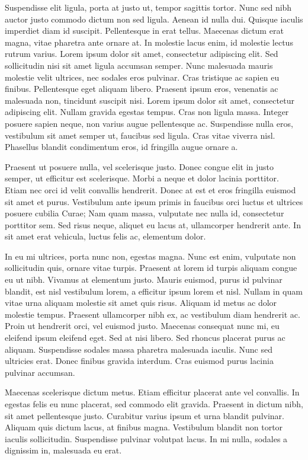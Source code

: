 Suspendisse elit ligula, porta at justo ut, tempor sagittis tortor. Nunc sed nibh auctor justo commodo dictum non sed ligula. Aenean id nulla dui. Quisque iaculis imperdiet diam id suscipit. Pellentesque in erat tellus. Maecenas dictum erat magna, vitae pharetra ante ornare at. In molestie lacus enim, id molestie lectus rutrum varius.
Lorem ipsum dolor sit amet, consectetur adipiscing elit. Sed sollicitudin nisi sit amet ligula accumsan semper. Nunc malesuada mauris molestie velit ultrices, nec sodales eros pulvinar. Cras tristique ac sapien eu finibus. Pellentesque eget aliquam libero. Praesent ipsum eros, venenatis ac malesuada non, tincidunt suscipit nisi. Lorem ipsum dolor sit amet, consectetur adipiscing elit. Nullam gravida egestas tempus. Cras non ligula massa. Integer posuere sapien neque, non varius augue pellentesque ac. Suspendisse nulla eros, vestibulum sit amet semper ut, faucibus sed ligula. Cras vitae viverra nisl. Phasellus blandit condimentum eros, id fringilla augue ornare a.

Praesent ut posuere nulla, vel scelerisque justo. Donec congue elit in justo semper, ut efficitur est scelerisque. Morbi a neque et dolor lacinia porttitor. Etiam nec orci id velit convallis hendrerit. Donec at est et eros fringilla euismod sit amet et purus. Vestibulum ante ipsum primis in faucibus orci luctus et ultrices posuere cubilia Curae; Nam quam massa, vulputate nec nulla id, consectetur porttitor sem. Sed risus neque, aliquet eu lacus at, ullamcorper hendrerit ante. In sit amet erat vehicula, luctus felis ac, elementum dolor.

In eu mi ultrices, porta nunc non, egestas magna. Nunc est enim, vulputate non sollicitudin quis, ornare vitae turpis. Praesent at lorem id turpis aliquam congue eu ut nibh. Vivamus at elementum justo. Mauris euismod, purus id pulvinar blandit, est nisl vestibulum lorem, a efficitur ipsum lorem et nisl. Nullam in quam vitae urna aliquam molestie sit amet quis risus. Aliquam id metus ac dolor molestie tempus. Praesent ullamcorper nibh ex, ac vestibulum diam hendrerit ac. Proin ut hendrerit orci, vel euismod justo. Maecenas consequat nunc mi, eu eleifend ipsum eleifend eget. Sed at nisi libero. Sed rhoncus placerat purus ac aliquam. Suspendisse sodales massa pharetra malesuada iaculis. Nunc sed ultricies erat. Donec finibus gravida interdum. Cras euismod purus lacinia pulvinar accumsan.

Maecenas scelerisque dictum metus. Etiam efficitur placerat ante vel convallis. In egestas felis eu nunc placerat, sed commodo elit gravida. Praesent in dictum nibh, sit amet pellentesque justo. Curabitur varius ipsum et urna blandit pulvinar. Aliquam quis dictum lacus, at finibus magna. Vestibulum blandit non tortor iaculis sollicitudin. Suspendisse pulvinar volutpat lacus. In mi nulla, sodales a dignissim in, malesuada eu erat.

